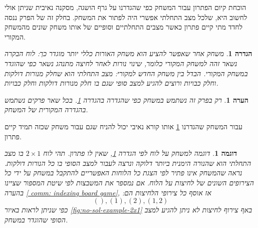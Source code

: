 \documentclass[12pt,leqno]{article}
\theoremstyle{theoremdd}
\newtheorem{definition}{הגדרה}[section]
\newtheorem{example}{דוגמה}[section]
\newtheorem{comm}{הערה}[section]
\begin{document}
הוכחת קיום הפתרון עבור המשחק כפי שהגדרנו  על גרף הושגה,
מסקנה נאיבית שניתן אולי לחשוב היא,
שלכל מצב התחלתי
אפשרי היה לפתור את המשחק. בחלק זה של הפרק ננסה לחדד מתי קיים פתרון כאשר
מצבים התחלתיים וסופיים של אותו משחק שונים מהמשחק המקורי.
\begin{definition}
    \label{def:diff-game}
    משחק אחר שאפשר להציע הוא משחק האורות כללי יותר מוגדר כך:
    לוח הבקרה נשאר זהה למשחק המקורי כלומר, שינוי נורות 
    לאחר לחיצה מתנהג נשאר כפי שהוגדר במשחק המקורי.
    הבדל בין משחק החדש למקורי:
    מצב התחלתי הוא שחלק מנורות דולקות וחלק כבויות
    ורוצים להגיע למצב סופי שגם בו חלק מנורות דולקות וחלק כבויות.
\end{definition}
\begin{comm}
    רק בפרק זה נשתמש במשחק כפי שהגדרה 
    בהגדרה 
    \ref{def:diff-game}.
    בכל שאר פרקים נשתמש בהגדרה המקורית של המשחק.
\end{comm}
עבור המשחק שהגדרנו 
\ref{def:diff-game}
אותו קורא נאיבי יכול להניח שגם עבור משחק שכזה תמיד קיים פתרון.
\begin{example}
    דוגמה למשחק על לוח 
    לפי 
    הגדרה 
    \ref{def:diff-game},
    שאין לו פתרון.
    תהי לוח 
    $2 \times 1$
    בו מצב התחלתי הוא שהנורה הימנית ביותר דלוקה ונרצה לעבור למצב הסופי בו כל 
    הנורות דולקות.
    נראה 
    שהמשחק אינו פתיר
    לפי 
    הצגת כל הלוחות האפשריים 
    להתקבל
    במשחק על ידי 
    כל
    הצירופים השונים של לחיצות על הלוח.
    אם נמספר את המשבצות לפי שיטת המספור שציינו בהערה 
    \ref{ comm: indexing board game},
    אז אוסף כל צירופי הלחיצות הם:
    \[
        (), (1), (2), (1,2)
    \]
    כפי שניתן לראות 
    באיור 
    \ref{fig:no-sol-example-2x1}
    באף צירוף לחיצות לא ניתן להגיע למצב הסופי שהוגדר במשחק.
\end{example}
\end{document}
